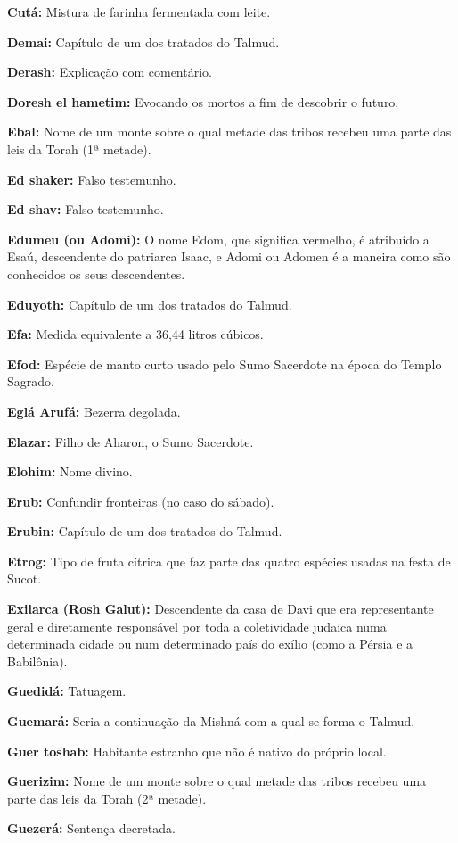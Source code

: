 \begin{hangparas}{.25in}{1}
{\textbf{Cutá:} Mistura de farinha fermentada com leite.

\textbf{Demai:} Capítulo de um dos tratados do Talmud.

\textbf{Derash:} Explicação com comentário.

\textbf{Doresh el hametim:} Evocando os mortos a fim de descobrir o futuro.

\textbf{Ebal:} Nome de um monte sobre o qual metade das tribos recebeu uma parte das leis da Torah (1ª metade).

\textbf{Ed shaker:} Falso testemunho.

\textbf{Ed shav:} Falso testemunho.

\textbf{Edumeu (ou Adomi):} O nome Edom, que significa vermelho, é
atribuído a Esaú, descendente do patriarca Isaac, e Adomi ou Adomen é
a maneira como são conhecidos os seus descendentes.

\textbf{Eduyoth:} Capítulo de um dos tratados do Talmud.

\textbf{Efa:} Medida equivalente a 36,44 litros cúbicos.

\textbf{Efod:} Espécie de manto curto usado pelo Sumo Sacerdote na
época do Templo Sagrado.

\textbf{Eglá Arufá:} Bezerra degolada.

\textbf{Elazar:} Filho de Aharon, o Sumo Sacerdote.

\textbf{Elohim:} Nome divino.

\textbf{Erub:} Confundir fronteiras (no caso do sábado).

\textbf{Erubin:} Capítulo de um dos tratados do Talmud.

\textbf{Etrog:} Tipo de fruta cítrica que faz parte das quatro espécies
usadas na festa de Sucot.

\textbf{Exilarca (Rosh Galut):} Descendente da casa de Davi que era
representante geral e diretamente responsável por toda a coletividade
judaica numa determinada cidade ou num determinado país do exílio (como
a Pérsia e a Babilônia).

\textbf{Guedidá:} Tatuagem.

\textbf{Guemará:} Seria a continuação da Mishná com a qual se forma o
Talmud.

\textbf{Guer toshab:} Habitante estranho que não é nativo do próprio local.

\textbf{Guerizim:} Nome de um monte sobre o qual metade das tribos recebeu uma parte das leis da Torah (2ª metade).

\textbf{Guezerá:} Sentença decretada.

}
\end{hangparas}
